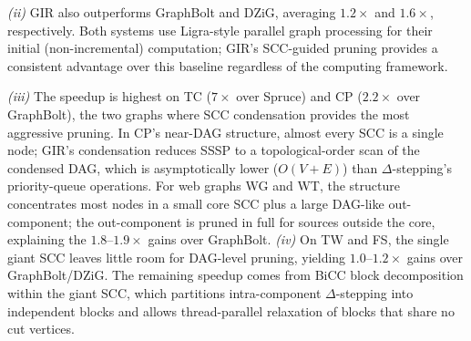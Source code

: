 \textit{(ii)} GIR also outperforms GraphBolt and DZiG, averaging $1.2\times$ and $1.6\times$, respectively.
Both systems use Ligra-style parallel graph processing for their initial (non-incremental) computation; GIR's SCC-guided pruning provides a consistent advantage over this baseline regardless of the computing framework.
\begin{maybecut}
\textit{(iii)} The speedup is highest on TC ($7\times$ over Spruce) and CP ($2.2\times$ over GraphBolt), the two graphs where SCC condensation provides the most aggressive pruning.
In CP's near-DAG structure, almost every SCC is a single node; GIR's condensation reduces SSSP to a topological-order scan of the condensed DAG, which is asymptotically lower ($O(V{+}E)$) than $\Delta$-stepping's priority-queue operations.
For web graphs WG and WT, the structure concentrates most nodes in a small core SCC plus a large DAG-like out-component; the out-component is pruned in full for sources outside the core, explaining the $1.8$--$1.9\times$ gains over GraphBolt.
\textit{(iv)} On TW and FS, the single giant SCC leaves little room for DAG-level pruning, yielding $1.0$--$1.2\times$ gains over GraphBolt/DZiG.
The remaining speedup comes from BiCC block decomposition within the giant SCC, which partitions intra-component $\Delta$-stepping into independent blocks and allows thread-parallel relaxation of blocks that share no cut vertices.
\end{maybecut}

